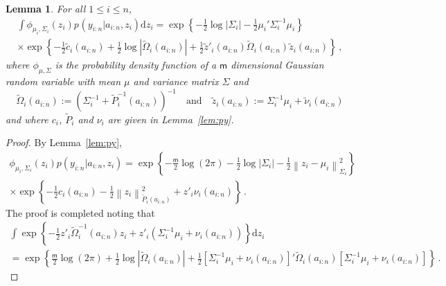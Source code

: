 \documentclass[nolayout]{article}
\theoremstyle{plain}
\newtheorem{lemma}[lemma]{Lemma}
\theoremstyle{definition}
\newcommand{\1}{\mathbbm{1}}
\def\rmd{\mathrm{d}}
\def\dimz{\mathsf{m}}
\def\eqsp{\,}
\newcommand{\normMat}[2]{\left\|#2\right\|_{#1}}
\newcommand{\eqdef}{\ensuremath{:=}}
\begin{document}
\begin{lemma}
\label{lem:integral:gammap}
For all $1\le i\le n$,
\begin{multline*}
\int \phi_{\mu_i,\Sigma_i}(z_i)p_{}(y_{i:n}|a_{i:n},z_i)\rmd z_{i} = \exp\left\{-\frac{1}{2}\log |\Sigma_i| - \frac{1}{2}\mu_i'\Sigma^{-1}_i\mu_i\right\}\\
\times\exp\left\{-\frac{1}{2}\tilde{c}_{i}(a_{i:n})+\frac{1}{2}\log|\tilde{\Omega}_{i}(a_{i:n})| +\frac{1}{2}\tilde{z}'_i(a_{i:n})\tilde{\Omega}_{i}(a_{i:n})\tilde{z}_i(a_{i:n})\right\}\eqsp,
\end{multline*}
where $\phi_{\mu,\Sigma}$ is the probability density function of a $\dimz$ dimensional Gaussian random variable with mean $\mu$ and variance matrix $\Sigma$ and
\[
\tilde{\Omega}_{i}(a_{i:n})\eqdef \left(\Sigma_i^{-1} + \tilde{P}_{i}^{-1}(a_{i:n})\right)^{-1}\quad\mbox{and}\quad
\tilde{z}_i(a_{i:n})\eqdef \Sigma_i^{-1}\mu_i+\tilde{\nu}_{i}(a_{i:n})
\]
and where $c_{i}$, $\tilde{P}_{i}$ and $\nu_{i}$ are given in Lemma~\ref{lem:py}.
\end{lemma}
\begin{proof}
By Lemma~\ref{lem:py},
\begin{multline*}
\phi_{\mu_i,\Sigma_i}(z_i)p(y_{i:n}|a_{i:n},z_i) = \exp\left\{-\frac{\dimz}{2}\log(2\pi) -\frac{1}{2}\log|\Sigma_i|-\frac{1}{2}\normMat{\Sigma_i}{z_i-\mu_i}^2\right\}\\
\times\exp\left\{-\frac{1}{2}c_{i}(a_{i:n})-\frac{1}{2}\normMat{\tilde{P}_{i}(a_{i:n})}{z_i}^2+z'_i\nu_{i}(a_{i:n})\right\}\eqsp.
\end{multline*}
The proof is completed noting that
\begin{multline*}
\int \exp\left\{-\frac{1}{2}z'_i\tilde{\Omega}_{i}^{-1}(a_{i:n})z_i + z'_i(\Sigma_i^{-1}\mu_i+\nu_{i}(a_{i:n}))\right\}\rmd z_{i}\\
= \exp\left\{\frac{\dimz}{2}\log(2\pi) + \frac{1}{2}\log|\tilde{\Omega}_{i}(a_{i:n})| +\frac{1}{2}\left[\Sigma_i^{-1}\mu_i+\nu_{i}(a_{i:n})\right]'\tilde{\Omega}_{i}(a_{i:n})\left[\Sigma_i^{-1}\mu_i+\nu_{i}(a_{i:n})\right]\right\}\eqsp.
\end{multline*}\end{proof}
\end{document}
